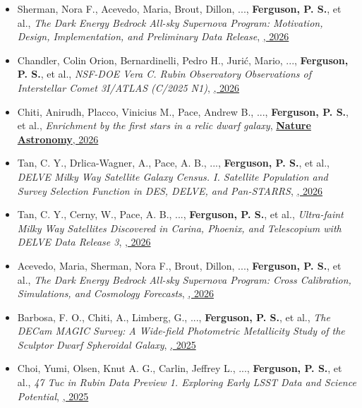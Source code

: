 \begin{itemize}[itemsep=1pt]
    \item {Sherman}, Nora F., {Acevedo}, Maria, {Brout}, Dillon, ..., \textbf{Ferguson, P. S.}, et al., \textit{{The Dark Energy Bedrock All-sky Supernova Program: Motivation, Design, Implementation, and Preliminary Data Release}}, \href{https://ui.adsabs.harvard.edu/abs/2026ApJ..1002..146S}{\textbf{\apj}, 2026}
    \item {Chandler}, Colin Orion, {Bernardinelli}, Pedro H., {Juri{\'c}}, Mario, ..., \textbf{Ferguson, P. S.}, et al., \textit{{NSF-DOE Vera C. Rubin Observatory Observations of Interstellar Comet 3I/ATLAS (C/2025 N1)}}, \href{https://ui.adsabs.harvard.edu/abs/2026ApJ..1001L..35C}{\textbf{\apjl}, 2026}
    \item {Chiti}, Anirudh, {Placco}, Vinicius M., {Pace}, Andrew B., ..., \textbf{Ferguson, P. S.}, et al., \textit{{Enrichment by the first stars in a relic dwarf galaxy}}, \href{https://ui.adsabs.harvard.edu/abs/2026NatAs..10..830C}{\textbf{Nature Astronomy}, 2026}
    \item {Tan}, C. Y., {Drlica-Wagner}, A., {Pace}, A. B., ..., \textbf{Ferguson, P. S.}, et al., \textit{{DELVE Milky Way Satellite Galaxy Census. I. Satellite Population and Survey Selection Function in DES, DELVE, and Pan-STARRS}}, \href{https://ui.adsabs.harvard.edu/abs/2026ApJ..1000...87T}{\textbf{\apj}, 2026}
    \item {Tan}, C. Y., {Cerny}, W., {Pace}, A. B., ..., \textbf{Ferguson, P. S.}, et al., \textit{{Ultra-faint Milky Way Satellites Discovered in Carina, Phoenix, and Telescopium with DELVE Data Release 3}}, \href{https://ui.adsabs.harvard.edu/abs/2026ApJ..1000...46T}{\textbf{\apj}, 2026}
    \item {Acevedo}, Maria, {Sherman}, Nora F., {Brout}, Dillon, ..., \textbf{Ferguson, P. S.}, et al., \textit{{The Dark Energy Bedrock All-sky Supernova Program: Cross Calibration, Simulations, and Cosmology Forecasts}}, \href{https://ui.adsabs.harvard.edu/abs/2026ApJ...996....7A}{\textbf{\apj}, 2026}
    \item {Barbosa}, F. O., {Chiti}, A., {Limberg}, G., ..., \textbf{Ferguson, P. S.}, et al., \textit{{The DECam MAGIC Survey: A Wide-field Photometric Metallicity Study of the Sculptor Dwarf Spheroidal Galaxy}}, \href{https://ui.adsabs.harvard.edu/abs/2025ApJ...993...77B}{\textbf{\apj}, 2025}
    \item {Choi}, Yumi, {Olsen}, Knut A. G., {Carlin}, Jeffrey L., ..., \textbf{Ferguson, P. S.}, et al., \textit{{47 Tuc in Rubin Data Preview 1. Exploring Early LSST Data and Science Potential}}, \href{https://ui.adsabs.harvard.edu/abs/2025ApJ...992...47C}{\textbf{\apj}, 2025}

\end{itemize}
